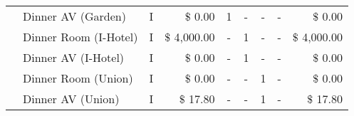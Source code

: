 \begin{table}[h]
{\begin{tabular}{|clcrccccr|}
     & Dinner AV (Garden)        & I                         & $\$$ 0.00                 &    1                      &        -                 &        -                  &        -                  & $\$$ 0.00                 \\
     & Dinner Room (I-Hotel)     & I                         & $\$$ 4,000.00             &     -                     &         1                &         -                 &         -                 & $\$$ 4,000.00             \\ 
     & Dinner AV (I-Hotel)       & I                         & $\$$ 0.00                 &      -                    &          1               &          -                &          -                & $\$$ 0.00                 \\
     & Dinner Room (Union)       & I                         & $\$$ 0.00                 &     -                     &         -                &         1                 &         -                 & $\$$ 0.00                 \\ 
     & Dinner AV (Union)         & I                         & $\$$ 17.80                &      -                    &          -               &        1                  &          -                & $\$$ 17.80                \\ \hline  
     

\end{tabular}}
\end{table}
